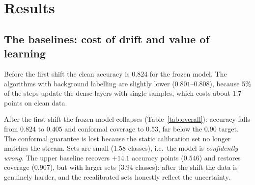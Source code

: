 \documentclass[11pt,a4paper]{article}
\begin{document}
\section{Results}
\label{sec:results}

\subsection{The baselines: cost of drift and value of learning}

Before the first shift the clean accuracy is $0.824$ for the frozen model. The algorithms with background labelling are slightly lower ($0.801$--$0.808$), because 5\% of
the steps update the dense layers with single samples, which costs about $1.7$ points on clean data.

After the first shift the frozen model collapses (Table~\ref{tab:overall}): accuracy falls from $0.824$ to $0.405$ and conformal coverage to $0.53$, far below the $0.90$ target. The conformal guarantee is lost because
the static calibration set no longer matches the stream. Sets are small ($1.58$ classes), i.e.\ the model is \emph{confidently wrong}.
The upper baseline recovers $+14.1$ accuracy points ($0.546$) and restores coverage ($0.907$), but with larger sets ($3.94$ classes): after the shift the data is genuinely harder, and the
recalibrated sets honestly reflect the uncertainty.
\end{document}
